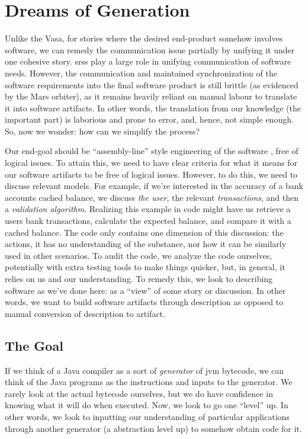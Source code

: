 \section{Dreams of Generation}
\label{chap:ideology:sec:thoughts_of_generation}

Unlike the Vasa, for stories where the desired end-product somehow involves
software, we can remedy the communication issue partially by unifying it under
one cohesive story. \Aclp{srs} play a large role in unifying communication of
software needs. However, the communication and maintained synchronization of the
software requirements into the final software product is still brittle (as
evidenced by the Mars orbiter), as it remains heavily reliant on manual labour
to translate it into software artifacts. In other words, the translation from
our knowledge (the important part) is laborious and prone to error, and, hence,
not simple enough. So, now we wonder: how can we simplify the process?

Our end-goal should be ``assembly-line'' style engineering of the software
\cite{well-understood}, free of logical issues. To attain this, we need to have
clear criteria for what it means for our software artifacts to be free of
logical issues. However, to do this, we need to discuss relevant models. For
example, if we're interested in the accuracy of a bank accounts cached balance,
we discuss \textit{the user}, the relevant \textit{transactions}, and then a
\textit{validation algorithm}. Realizing this example in code might have us
retrieve a users bank transactions, calculate the expected balance, and compare
it with a cached balance. The code only contains one dimension of this
discussion: the actions, it has no understanding of the substance, nor how it
can be similarly used in other scenarios. To audit the code, we analyze the code
ourselves, potentially with extra testing tools to make things quicker, but, in
general, it relies on us and our understanding. To remedy this, we look to
describing software as we've done here: as a ``view'' of some story or
discussion. In other words, we want to build software artifacts through
description as opposed to manual conversion of description to artifact.

\subsection{The Goal}
\label{chap:ideology:sec:thoughts_of_generation:subsec:the_goal}

If we think of a Java compiler as a sort of \textit{generator} of \acs{jvm}
bytecode, we can think of the Java programs as the instructions and inputs to
the generator. We rarely look at the actual bytecode ourselves, but we do have
confidence in knowing what it will do when executed. Now, we look to go one
``level'' up. In other words, we look to inputting our understanding of
particular applications through another generator (a abstraction level up) to
somehow obtain code for it.

